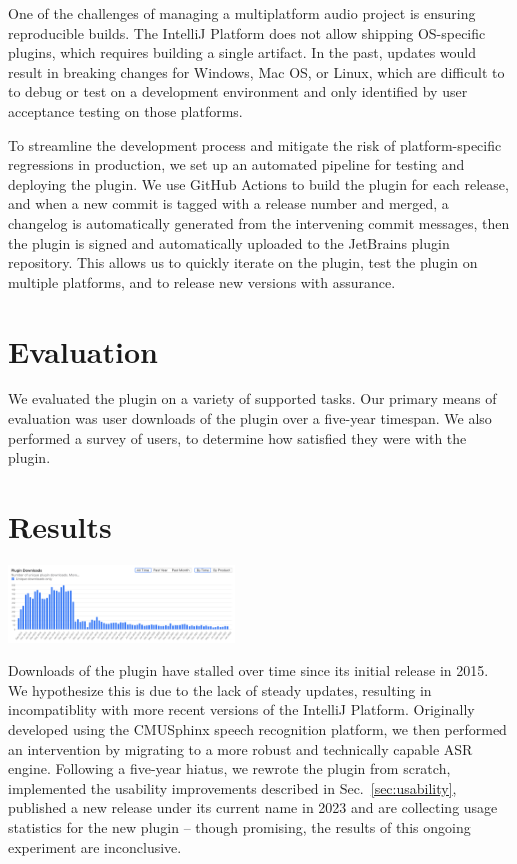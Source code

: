 \documentclass[conference]{IEEEtran}
\begin{document}
One of the challenges of managing a multiplatform audio project is ensuring reproducible builds. The IntelliJ Platform does not allow shipping OS-specific plugins, which requires building a single artifact. In the past, updates would result in breaking changes for Windows, Mac OS, or Linux, which are difficult to to debug or test on a development environment and only identified by user acceptance testing on those platforms.

To streamline the development process and mitigate the risk of platform-specific regressions in production, we set up an automated pipeline for testing and deploying the plugin. We use GitHub Actions to build the plugin for each release, and when a new commit is tagged with a release number and merged, a changelog is automatically generated from the intervening commit messages, then the plugin is signed and automatically uploaded to the JetBrains plugin repository. This allows us to quickly iterate on the plugin, test the plugin on multiple platforms, and to release new versions with assurance.

\section{Evaluation}

We evaluated the plugin on a variety of supported tasks. Our primary means of evaluation was user downloads of the plugin over a five-year timespan. We also performed a survey of users, to determine how satisfied they were with the plugin.



\section{Results}

\includegraphics[width=0.45\textwidth]{downloads.png}

Downloads of the plugin have stalled over time since its initial release in 2015. We hypothesize this is due to the lack of steady updates, resulting in incompatiblity with more recent versions of the IntelliJ Platform. Originally developed using the CMUSphinx speech recognition platform, we then performed an intervention by migrating to a more robust and technically capable ASR engine. Following a five-year hiatus, we rewrote the plugin from scratch, implemented the usability improvements described in Sec.~\ref{sec:usability}, published a new release under its current name in 2023 and are collecting usage statistics for the new plugin -- though promising, the results of this ongoing experiment are inconclusive.
\end{document}
